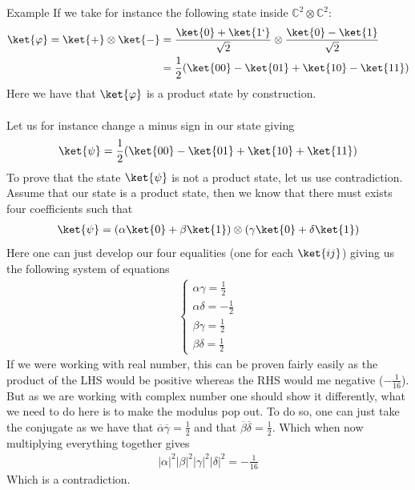 \begin{parag}{Example}
    If we take for instance the following state inside $\mathbb{C}^2 \otimes \mathbb{C}^2$:
	\begin{align*} 
		\ket{\varphi}=  \ket{+} \otimes \ket{-} &= \frac{\ket{0} + \ket{1`}}{\sqrt{2}} \otimes \frac{\ket{0} - \ket{1}}{\sqrt{2}}\\
		&= \frac{1}{2}\left(\ket{00} - \ket{01} + \ket{10} - \ket{11}\right)
	\end{align*}
	Here we have that $\ket{\varphi}$ is a product state by construction.\\
	$ $\\
	Let us for instance change a minus sign in our state giving 
	\begin{align*} 
		\ket{\psi} = \frac{1}{2}\left(\ket{00} - \ket{01} + \ket{10} + \ket{11}\right) 
	\end{align*}
	To prove that the state $\ket{\psi}$ is not a product state, let us use contradiction. Assume that our state is a product state, then we know that there must exists four coefficients such that 
	\begin{align*} 
		\ket{\psi} = \left(\alpha \ket{0} + \beta \ket{1}\right) \otimes \left(\gamma \ket{0} + \delta \ket{1}\right) 
	\end{align*}
	Here one can just develop our four equalities (one for each $\ket{ij}$) giving us the following system of equations
	\begin{align*} 
		\begin{cases}
			\alpha \gamma = \frac{1}{2} \\
			\alpha \delta = - \frac{1}{2}\\
			\beta \gamma = \frac{1}{2}\\
			\beta  \delta = \frac{1}{2}
		\end{cases}  
	\end{align*}
	If we were working with real number, this can be proven fairly easily as the product of the LHS would be positive whereas the RHS would me negative ($-\frac{1}{16}$). But as we are working with complex number one should show it differently, what we need to do here is to make the modulus pop out. To do so, one can just take the conjugate as we have that $\overline{\alpha}\overline{\gamma} = \frac{1}{2}$ and that $\overline{\beta}\overline{\delta} = \frac{1}{2}$. Which when now multiplying everything together gives 
	\begin{align*} 
		\left|\alpha\right|^2\left|\beta\right|^2\left|\gamma\right|^2\left|\delta\right|^2 = - \frac{1}{16} 
	\end{align*}
	Which is a contradiction.
\end{parag}

